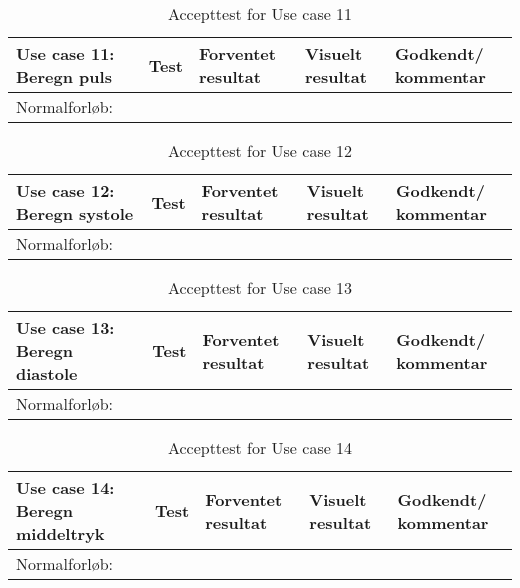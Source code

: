 \begin{table}[h!]
\caption{Accepttest for Use case 11}\label{tab:tabel8}
\begin{tabular}{|>{\raggedright\arraybackslash}p{2.5cm}| >{\raggedright\arraybackslash}p{2.9cm} | >{\raggedright\arraybackslash}p{2.9cm} | >{\raggedright\arraybackslash}p{2.9cm} | >{\raggedright\arraybackslash}p{2.8cm} |}
   \hline
   \textbf{Use case 11: Beregn puls } &\textbf{Test}& \textbf{Forventet resultat} & \textbf{Visuelt resultat} & \textbf{Godkendt/ kommentar}\\ \hline
   Normalforløb:& & & &\\\hline
\end{tabular}
\end{table}


\begin{table}[h!]
\caption{Accepttest for Use case 12}\label{tab:tabel8}
\begin{tabular}{|>{\raggedright\arraybackslash}p{2.5cm}| >{\raggedright\arraybackslash}p{2.9cm} | >{\raggedright\arraybackslash}p{2.9cm} | >{\raggedright\arraybackslash}p{2.9cm} | >{\raggedright\arraybackslash}p{2.8cm} |}
   \hline
   \textbf{Use case 12: Beregn systole } &\textbf{Test}& \textbf{Forventet resultat} & \textbf{Visuelt resultat} & \textbf{Godkendt/ kommentar}\\ \hline
   Normalforløb:& & & &\\\hline
\end{tabular}
\end{table}


\begin{table}[h!]
\caption{Accepttest for Use case 13}\label{tab:tabel8}
\begin{tabular}{|>{\raggedright\arraybackslash}p{2.5cm}| >{\raggedright\arraybackslash}p{2.9cm} | >{\raggedright\arraybackslash}p{2.9cm} | >{\raggedright\arraybackslash}p{2.9cm} | >{\raggedright\arraybackslash}p{2.8cm} |}
   \hline
   \textbf{Use case 13: Beregn diastole } &\textbf{Test}& \textbf{Forventet resultat} & \textbf{Visuelt resultat} & \textbf{Godkendt/ kommentar}\\ \hline
   Normalforløb:& & & &\\\hline
\end{tabular}
\end{table}


\begin{table}[h!]
\caption{Accepttest for Use case 14}\label{tab:tabel8}
\begin{tabular}{|>{\raggedright\arraybackslash}p{2.5cm}| >{\raggedright\arraybackslash}p{2.9cm} | >{\raggedright\arraybackslash}p{2.9cm} | >{\raggedright\arraybackslash}p{2.9cm} | >{\raggedright\arraybackslash}p{2.8cm} |}
   \hline
   \textbf{Use case 14: Beregn middeltryk } &\textbf{Test}& \textbf{Forventet resultat} & \textbf{Visuelt resultat} & \textbf{Godkendt/ kommentar}\\ \hline
   Normalforløb:& & & &\\\hline
\end{tabular}
\end{table}


